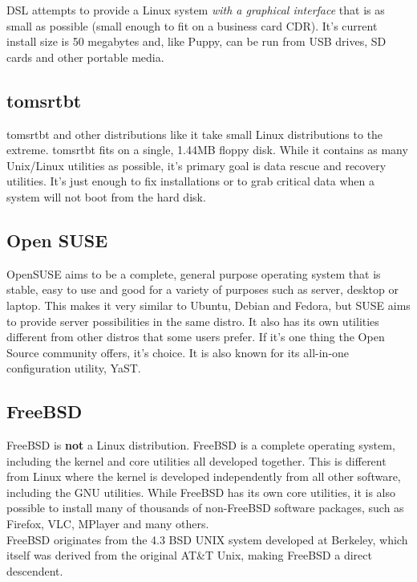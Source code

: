 DSL attempts to provide a Linux system \textit{with a graphical interface} that is as small as possible (small enough to fit on a business card CDR).  It's current install size is 50 megabytes and, like Puppy, can be run from USB drives, SD cards and other portable media.

\subsection{tomsrtbt}

tomsrtbt and other distributions like it take small Linux distributions to the extreme.  tomsrtbt fits on a single, 1.44MB floppy disk.  While it contains as many Unix/Linux utilities as possible, it's primary goal is data rescue and recovery utilities.  It's just enough to fix installations or to grab critical data when a system will not boot from the hard disk.

\subsection{Open SUSE}

OpenSUSE aims to be a complete, general purpose operating system that is stable, easy to use and good for a variety of purposes such as server, desktop or laptop.  This makes it very similar to Ubuntu, Debian and Fedora, but SUSE aims to provide server possibilities in the same distro.  It also has its own utilities different from other distros that some users prefer.  If it's one thing the Open Source community offers, it's choice.  It is also known for its all-in-one configuration utility, YaST.

\subsection{FreeBSD}

FreeBSD is \textbf{not} a Linux distribution.  FreeBSD is a complete operating system, including the kernel and core utilities all developed together.  This is different from Linux where the kernel is developed independently from all other software, including the GNU utilities.  While FreeBSD has its own core utilities, it is also possible to install many of thousands of non-FreeBSD software packages, such as Firefox, VLC, MPlayer and many others.\\

FreeBSD originates from the 4.3 BSD UNIX system developed at Berkeley, which itself was derived from the original AT\&T Unix, making FreeBSD a direct descendent.\\

